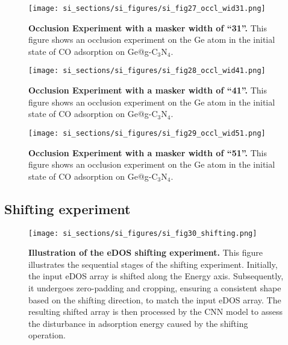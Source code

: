 \begin{figure}
  \centering
  \texttt{[image: si\_sections/si\_figures/si\_fig27\_occl\_wid31.png]}
  \caption{\textbf{Occlusion Experiment with a masker width of “31”.}
  This figure shows an occlusion experiment on the Ge atom in
  the initial state of CO adsorption on Ge@g-C$_3$N$_4$.}
  \label{si_fig27:occl_wid31}
\end{figure}


\begin{figure}
  \centering
  \texttt{[image: si\_sections/si\_figures/si\_fig28\_occl\_wid41.png]}
  \caption{\textbf{Occlusion Experiment with a masker width of “41”.}
  This figure shows an occlusion experiment on the Ge atom in
  the initial state of CO adsorption on Ge@g-C$_3$N$_4$.}
  \label{si_fig28:occl_wid41}
\end{figure}


\begin{figure}
  \centering
  \texttt{[image: si\_sections/si\_figures/si\_fig29\_occl\_wid51.png]}
  \caption{\textbf{Occlusion Experiment with a masker width of “51”.}
  This figure shows an occlusion experiment on the Ge atom in
  the initial state of CO adsorption on Ge@g-C$_3$N$_4$.}
  \label{si_fig29:occl_wid51}
\end{figure}


\subsection{Shifting experiment}


\begin{figure}
  \centering
  \texttt{[image: si\_sections/si\_figures/si\_fig30\_shifting.png]}
  \caption{\textbf{Illustration of the eDOS shifting experiment.}
  This figure illustrates the sequential stages of the shifting experiment.
  Initially, the input eDOS array is shifted along the Energy axis.
  Subsequently, it undergoes zero-padding and cropping,
  ensuring a consistent shape based on the shifting direction, to match the input eDOS array.
  The resulting shifted array is then processed by the CNN model to
  assess the disturbance in adsorption energy caused by the shifting operation.}
  \label{si_fig30:shifting}
\end{figure}



